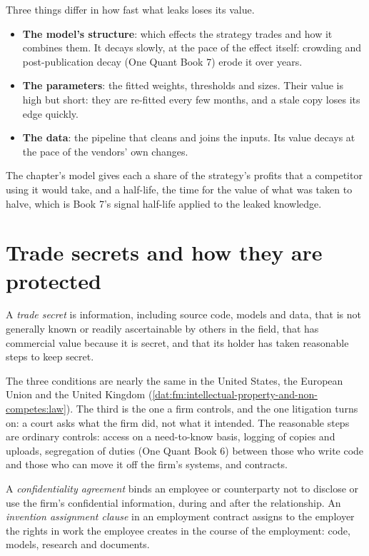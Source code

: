 Three things differ in how fast what leaks loses its value.
\begin{itemize}
\item \textbf{The model's structure}: which effects the strategy trades and how it combines them. It decays slowly, at the pace of the effect
itself: crowding and post-publication decay (One Quant Book 7) erode it over years.
\item \textbf{The parameters}: the fitted weights, thresholds and sizes. Their value is high but short: they are re-fitted every few months, and a
stale copy loses its edge quickly.
\item \textbf{The data}: the pipeline that cleans and joins the inputs. Its value decays at the pace of the vendors' own changes.
\end{itemize}
The chapter's model gives each a share of the strategy's profits that a competitor using it would take, and a half-life, the time for the value of
what was taken to halve, which is Book 7's signal half-life applied to the leaked knowledge.

\section{Trade secrets and how they are protected}

\begin{definition}\label{def:fm:intellectual-property-and-non-competes:secret}
A \emph{trade secret} is information, including source code, models and data, that is not generally known or readily
ascertainable by others in the field, that has commercial value because it is secret, and that its holder has taken reasonable steps to keep
secret.
\end{definition}

The three conditions are nearly the same in the United States, the European Union and the United Kingdom (\cref{dat:fm:intellectual-property-and-non-competes:law}).
The third is the one a firm controls, and the one litigation turns on: a court asks what the firm did, not what it intended. The reasonable steps
are ordinary controls: access on a need-to-know basis, logging of copies and uploads, segregation of duties (One Quant Book 6) between those who
write code and those who can move it off the firm's systems, and contracts.

\begin{definition}\label{def:fm:intellectual-property-and-non-competes:nda}
A \emph{confidentiality agreement} binds an employee or counterparty not to disclose or use the firm's
confidential information, during and after the relationship. An \emph{invention assignment clause} in an
employment contract assigns to the employer the rights in work the employee creates in the course of the employment: code, models, research and
documents.
\end{definition}

